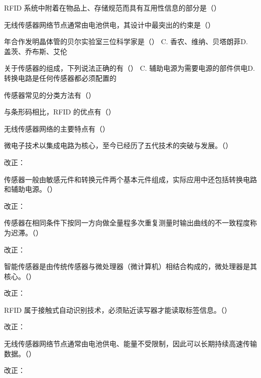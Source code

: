 \documentclass[a4paper,11pt]{article}
\begin{document}
\q RFID 系统中附着在物品上、存储规范而具有互用性信息的部分是（\quad）

\q 无线传感器网络节点通常由电池供电，其设计中最突出的约束是（\quad）

 年合作发明晶体管的贝尔实验室三位科学家是（\quad）
{C. 香农、维纳、贝塔朗菲}{D. 盖茨、乔布斯、艾伦}

\q 关于传感器的组成，下列说法正确的有（\quad）
{C. 辅助电源为需要电源的部件供电}{D. 转换电路是任何传感器都必须配置的}

\q 传感器常见的分类方法有（\quad）

\q 与条形码相比，RFID 的优点有（\quad）

\q 无线传感器网络的主要特点有（\quad）

\q 微电子技术以集成电路为核心，至今已经历了五代技术的突破与发展。\quad（\quad）\par\noindent 改正：\fixblank

\q 传感器一般由敏感元件和转换元件两个基本元件组成，实际应用中还包括转换电路和辅助电源。\quad（\quad）\par\noindent 改正：\fixblank

\q 传感器在相同条件下按同一方向做全量程多次重复测量时输出曲线的不一致程度称为迟滞。\quad（\quad）\par\noindent 改正：\fixblank

\q 智能传感器是由传统传感器与微处理器（微计算机）相结合构成的，微处理器是其核心。\quad（\quad）\par\noindent 改正：\fixblank

\q RFID 属于接触式自动识别技术，必须贴近读写器才能读取标签信息。\quad（\quad）\par\noindent 改正：\fixblank

\q 无线传感器网络节点通常由电池供电、能量不受限制，因此可以长期持续高速传输数据。\quad（\quad）\par\noindent 改正：\fixblank
\end{document}
